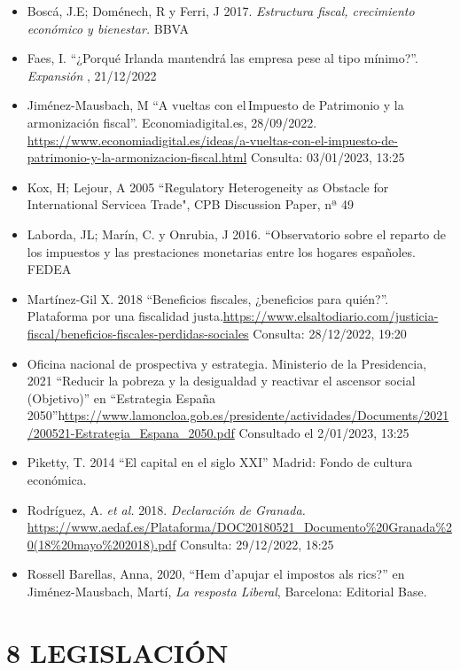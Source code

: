 \documentclass[
]{article}
\begin{document}
\begin{itemize}
\item
  Boscá, J.E; Doménech, R y Ferri, J 2017. \emph{Estructura fiscal,
  crecimiento económico y bienestar.} BBVA
\item
  Faes, I. ``¿Porqué Irlanda mantendrá las empresa pese al tipo
  mínimo?''. \emph{Expansión} , 21/12/2022
\item
  Jiménez-Mausbach, M ``A vueltas con el\,Impuesto de Patrimonio y la
  armonización fiscal''. Economiadigital.es, 28/09/2022.
  \url{https://www.economiadigital.es/ideas/a-vueltas-con-el-impuesto-de-patrimonio-y-la-armonizacion-fiscal.html}
  Consulta: 03/01/2023, 13:25
\item
  Kox, H; Lejour, A 2005 ``Regulatory Heterogeneity as Obstacle for
  International Servicea Trade", CPB Discussion Paper, nª 49
\item
  Laborda, JL; Marín, C. y Onrubia, J 2016. ``Observatorio sobre el
  reparto de los impuestos y las prestaciones monetarias entre los
  hogares españoles. FEDEA
\item
  Martínez-Gil X. 2018 ``Beneficios fiscales, ¿beneficios para quién?''.
  Plataforma por una fiscalidad
  justa.\url{https://www.elsaltodiario.com/justicia-fiscal/beneficios-fiscales-perdidas-sociales}
  Consulta: 28/12/2022, 19:20
\item
  Oficina nacional de prospectiva y estrategia. Ministerio de la
  Presidencia, 2021 ``Reducir la pobreza y la desigualdad y reactivar el
  ascensor social (Objetivo)'' en ``Estrategia España
  2050''h\href{https://www.lamoncloa.gob.es/presidente/actividades/Documents/2021/200521-Estrategia_Espana_2050.pdf}{ttps://www.lamoncloa.gob.es/presidente/actividades/Documents/2021/200521-Estrategia\_Espana\_2050.pdf}
  Consultado el 2/01/2023, 13:25
\item
  Piketty, T. 2014 ``El capital en el siglo XXI'' Madrid: Fondo de
  cultura económica.
\item
  Rodríguez, A. \emph{et al.} 2018. \emph{Declaración de Granada.}
  \url{https://www.aedaf.es/Plataforma/DOC20180521_Documento\%20Granada\%20(18\%20mayo\%202018).pdf}
  Consulta: 29/12/2022, 18:25
\item
  Rossell Barellas, Anna, 2020, ``Hem d'apujar el impostos als rics?''
  en Jiménez-Mausbach, Martí, \emph{La resposta Liberal}, Barcelona:
  Editorial Base.
\end{itemize}

\hypertarget{legislaciuxf3n}{%
\section*{8 LEGISLACIÓN}\label{legislaciuxf3n}}
\end{document}
